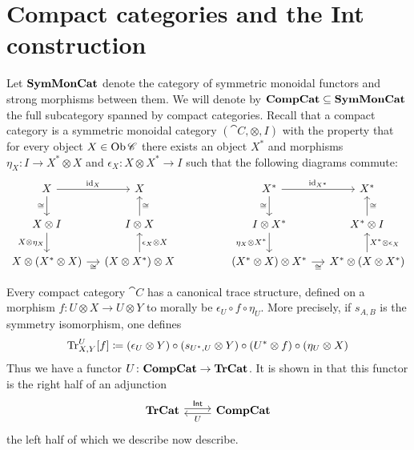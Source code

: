 \documentclass[12pt,oneside,article,draft]{memoir}
\begin{document}
{\begin{definition}
\end{definition}

}%

\section{Compact categories and the Int construction}\label{sec:compact and int}

Let $\mathbf{SymMonCat}$ denote the category of symmetric monoidal functors and strong morphisms between them. We will denote by $\mathbf{CompCat}\subseteq\mathbf{SymMonCat}$ the full subcategory spanned by compact categories. Recall that a compact category is a symmetric monoidal category $(\cat{C},\otimes,I)$ with the property that for every object $X\in\operatorname{Ob}\mathscr{C}$ there exists an object $X^*$ and morphisms $\eta_X\colon I\to X^*\otimes X$ and $\epsilon_X\colon X\otimes X^*\to I$ such that the following diagrams commute:
$$\begin{tikzcd}[column sep=small]
X\arrow[r,"\id_X"]\arrow[d,"\cong"']&X\\
X\otimes I\arrow[d,"X\otimes\eta_X"']&I\otimes X\arrow[u,"\cong"']\\
X\otimes(X^*\otimes X)\arrow[r,"\cong"']&(X\otimes X^*)\otimes X\arrow[u,"\epsilon_X\otimes X"']
\end{tikzcd}
\hspace{.6in}
\begin{tikzcd}[column sep=small]
X^*\arrow[r,"\id_{X^*}"]\arrow[d,"\cong"']&X^*\\
I\otimes X^*\arrow[d,"\eta_X\otimes X^*"']&X^*\otimes I\arrow[u,"\cong"']\\
(X^*\otimes X)\otimes X^*\arrow[r,"\cong"']&X^*\otimes (X\otimes X^*)\arrow[u,"X^*\otimes\epsilon_X"']
\end{tikzcd}
$$

Every compact category $\cat{C}$ has a canonical trace structure, defined on a morphism $f\colon U\otimes X\to U\otimes Y$ to morally be $\epsilon_U\circ f\circ \eta_U$. More precisely, if $s_{A,B}$ is the symmetry isomorphism, one defines
$$\operatorname{Tr}^U_{X,Y}[f]\coloneqq(\epsilon_U\otimes Y)\circ (s_{U^*,U}\otimes Y)\circ (U^*\otimes f)\circ (\eta_U\otimes X)$$
Thus we have a functor 
$U\colon\mathbf{CompCat}\to\mathbf{TrCat}$. It is shown in \cite{Joyal-Street-Verity} that this functor is the right half of an adjunction 
\begin{equation}\label{dia:traced compact adjunction}
\begin{tikzcd}
\TrCat\arrow[r,shift left=.5ex, "\Int"]&\CompCat\arrow[l,shift left=.5ex,"U"]
\end{tikzcd}
\end{equation}
the left half of which we describe now describe. 
\end{document}
